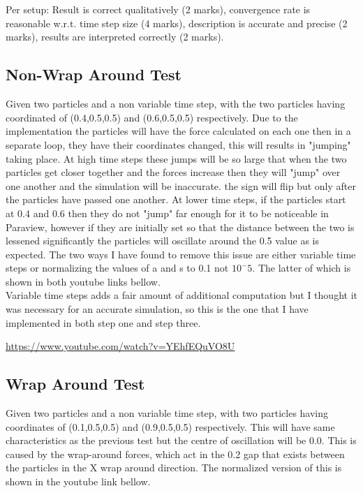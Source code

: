 \documentclass[paper=a4, fontsize=11pt]{scrartcl}
\numberwithin{equation}{section}		%
\numberwithin{figure}{section}			%
\numberwithin{table}{section}				%
\begin{document}
\section{}

Per setup: Result is correct qualitatively
(2 marks), convergence rate is
reasonable w.r.t. time step size (4
marks), description is accurate and
precise (2 marks), results are
interpreted correctly (2 marks). 

\subsection{Non-Wrap Around Test}

Given two particles and a non variable time step, with the two particles having coordinated of (0.4,0.5,0.5) and (0.6,0.5,0.5) respectively. Due to the implementation the particles will have the force calculated on each one then in a separate loop, they have their coordinates changed, this will results in "jumping" taking place. At high time steps these jumps will be so large that when the two particles get closer together and the forces increase then they will "jump" over one another and the simulation will be inaccurate. the sign will flip but only after the particles have passed one another. At lower time steps, if the particles start at 0.4 and 0.6 then they do not "jump" far enough for it to be noticeable in Paraview, however if they are initially set so that the distance between the two is lessened significantly the particles will oscillate around the 0.5 value as is expected. The two ways I have found to remove this issue are either variable time steps or normalizing the values of a and s to 0.1 not $10^-5$. The latter of which is shown in both youtube links bellow.\\
Variable time steps adds a fair amount of additional computation but I thought it was necessary for an accurate simulation, so this is the one that I have implemented in both step one and step three.

\url{https://www.youtube.com/watch?v=YEhfEQuVO8U}

\subsection{Wrap Around Test}

Given two particles and a non variable time step, with two particles having coordinates of (0.1,0.5,0.5) and (0.9,0.5,0.5) respectively. This will have same characteristics as the previous test but the centre of oscillation will be 0.0. This is caused by the wrap-around forces, which act in the 0.2 gap that exists between the particles in the X wrap around direction. The normalized version of this is shown in the youtube link bellow.
\end{document}
